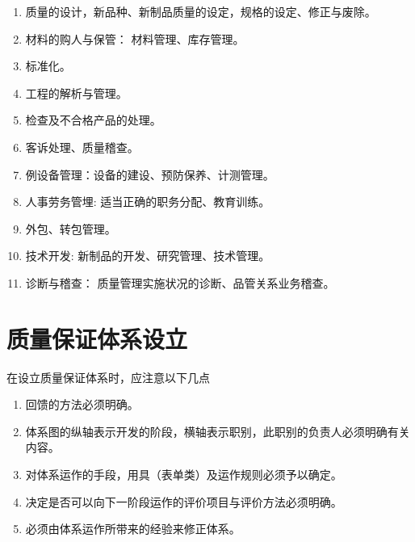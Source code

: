    \begin{enumerate}
        \item 质量的设计，新品种、新制品质量的设定，规格的设定、修正与废除。

        \item 材料的购人与保管： 材料管理、库存管理。

        \item 标准化。

        \item 工程的解析与管理。

        \item 检查及不合格产品的处理。

        \item 客诉处理、质量稽查。

        \item 例设备管理：设备的建设、预防保养、计测管理。

        \item 人事劳务管埋: 适当正确的职务分配、教育训练。

        \item  外包、转包管理。

        \item 技术开发: 新制品的开发、研究管理、技术管理。

        \item 诊断与稽查： 质量管理实施状况的诊断、品管关系业务稽查。
    \end{enumerate}

\section {质量保证体系设立}

    在设立质量保证体系时，应注意以下几点

    \begin{enumerate}
        \item 回馈的方法必须明确。

        \item 体系图的纵轴表示开发的阶段，横轴表示职别，此职别的负责人必须明确有关内容。

        \item 对体系运作的手段，用具（表单类）及运作规则必须予以确定。

        \item 决定是否可以向下一阶段运作的评价项目与评价方法必须明确。

        \item 必须由体系运作所带来的经验来修正体系。
    \end{enumerate}

